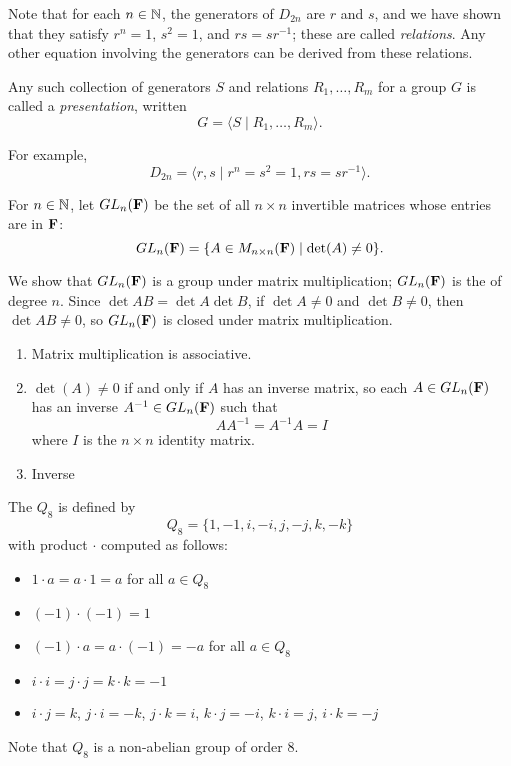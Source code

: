 Note that for each $n\in\mathbb N$, the generators of $D_{2n}$ are $r$ and $s$, and we have shown that they satisfy $r^n=1$, $s^2=1$, and $rs=sr^{-1}$; these are called \emph{relations}. Any other equation involving the generators can be derived from these relations.

Any such collection of generators $S$ and relations $R_1,\dots,R_m$ for a group $G$ is called a \emph{presentation}, written
\[G=\langle S\mid R_1,\dots,R_m\rangle.\]

For example,
\[D_{2n}=\langle r,s\mid r^n=s^2=1,rs=sr^{-1}\rangle.\]

\begin{example}
For $n\in\mathbb N$, let $GL_n(\mathbf F)$ be the set of all $n\times n$ invertible matrices whose entries are in $\mathbf F$:
\[GL_n(\mathbf F)=\{A\in M_{n\times n}(\mathbf F)\mid\det(A)\neq0\}.\]

We show that $GL_n(\mathbf F)$ is a group under matrix multiplication; $GL_n(\mathbf F)$ is the  of degree $n$. 
Since $\det AB=\det A\det B$, if $\det A\neq0$ and $\det B\neq0$, then $\det AB\neq0$, so $GL_n(\mathbf F)$ is closed under matrix multiplication.
\begin{enumerate}[label=(\roman*)]
\item Matrix multiplication is associative.
\item $\det(A)\neq0$ if and only if $A$ has an inverse matrix, so each $A\in GL_n(\mathbf F)$ has an inverse $A^{-1}\in GL_n(\mathbf F)$ such that
\[AA^{-1}=A^{-1}A=I\]
where $I$ is the $n\times n$ identity matrix.
\item Inverse
\end{enumerate}
\end{example}

\begin{example}
The  $Q_8$ is defined by
\[Q_8=\{1,-1,i,-i,j,-j,k,-k\}\]
with product $\cdot$ computed as follows:
\begin{itemize}
\item $1\cdot a=a\cdot 1=a$ for all $a\in Q_8$
\item $(-1)\cdot(-1)=1$
\item $(-1)\cdot a=a\cdot(-1)=-a$ for all $a\in Q_8$
\item $i\cdot i=j\cdot j=k\cdot k=-1$
\item $i\cdot j=k$, $j\cdot i=-k$, $j\cdot k=i$, $k\cdot j=-i$, $k\cdot i=j$, $i\cdot k=-j$
\end{itemize}
Note that $Q_8$ is a non-abelian group of order $8$.
\end{example}


